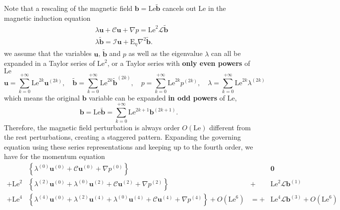 Note that a rescaling of the magnetic field $\mathbf{b} = \mathrm{Le} \tilde{\mathbf{b}}$ cancels out $\mathrm{Le}$ in the magnetic induction equation 
%
\begin{equation}
    \begin{aligned}
        &\lambda \mathbf{u} + \mathcal{C} \mathbf{u} + \nabla p = \mathrm{Le}^2 \mathcal{L} \tilde{\mathbf{b}} \\ 
        &\lambda \tilde{\mathbf{b}} = \mathcal{I} \mathbf{u} + \mathrm{E}_\eta \nabla^2 \tilde{\mathbf{b}}.
    \end{aligned}
\end{equation}
%
we assume that the variables $\mathbf{u}$, $\tilde{\mathbf{b}}$ and $p$ as well as the eigenvalue $\lambda$ can all be expanded in a Taylor series of $\mathrm{Le}^2$, or a Taylor series with \textbf{only even powers} of $\mathrm{Le}$
%
\begin{equation}
    \mathbf{u} = \sum_{k=0}^{+\infty} \mathrm{Le}^{2k} \mathbf{u}^{(2k)}, \quad 
    \tilde{\mathbf{b}} = \sum_{k=0}^{+\infty} \mathrm{Le}^{2k} \tilde{\mathbf{b}}^{(2k)}, \quad 
    p = \sum_{k=0}^{+\infty} \mathrm{Le}^{2k} p^{(2k)}, \quad 
    \lambda = \sum_{k=0}^{+\infty} \mathrm{Le}^{2k} \lambda^{(2k)}
\end{equation}
%
which means the original $\mathbf{b}$ variable can be expanded \textbf{in odd powers} of $\mathrm{Le}$,
%
\begin{equation}
    \mathbf{b} = \mathrm{Le} \tilde{\mathbf{b}} = \sum_{k=0}^{+\infty} \mathrm{Le}^{2k+1} \mathbf{b}^{(2k+1)}.
\end{equation}
%
Therefore, the magnetic field perturbation is always order $O(\mathrm{Le})$ different from the rest perturbations, creating a staggered pattern. Expanding the governing equation using these series representations and keeping up to the fourth order, we have for the momentum equation
%
\begin{equation}
    \begin{aligned}
        & \left\{\lambda^{(0)} \mathbf{u}^{(0)} + \mathcal{C} \mathbf{u}^{(0)} + \nabla p^{(0)}\right\} & & \mathbf{0} \\
        + \mathrm{Le}^2 & \left\{\lambda^{(2)} \mathbf{u}^{(0)} + \lambda^{(0)} \mathbf{u}^{(2)} + \mathcal{C} \mathbf{u}^{(2)} + \nabla p^{(2)}\right\} & +&\mathrm{Le}^2 \mathcal{L} \mathbf{b}^{(1)} \\
        + \mathrm{Le}^4 & \left\{\lambda^{(4)} \mathbf{u}^{(0)} + \lambda^{(2)} \mathbf{u}^{(4)} + \lambda^{(0)} \mathbf{u}^{(4)} + \mathcal{C} \mathbf{u}^{(4)} + \nabla p^{(4)}\right\} + O\left(\mathrm{Le}^6\right) & =+& \mathrm{Le}^4\mathcal{L}\mathbf{b}^{(3)} + O\left(\mathrm{Le}^6\right) \\ 
    \end{aligned}
\end{equation}
